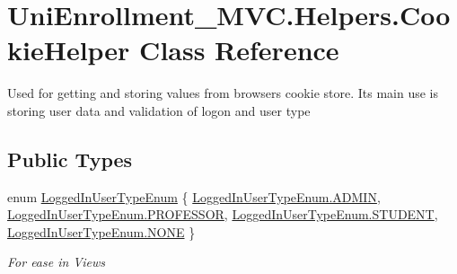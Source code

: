 \hypertarget{class_uni_enrollment___m_v_c_1_1_helpers_1_1_cookie_helper}{}\section{Uni\+Enrollment\+\_\+\+M\+V\+C.\+Helpers.\+Cookie\+Helper Class Reference}
\label{class_uni_enrollment___m_v_c_1_1_helpers_1_1_cookie_helper}


Used for getting and storing values from browser\textquotesingle{}s cookie store. It\textquotesingle{}s main use is storing user data and validation of logon and user type  


\subsection*{Public Types}
\begin{DoxyCompactItemize}
\item 
enum \hyperlink{class_uni_enrollment___m_v_c_1_1_helpers_1_1_cookie_helper_a6ccf3689f1679dfef56e5e7e3a5f17c9}{Logged\+In\+User\+Type\+Enum} \{ \hyperlink{class_uni_enrollment___m_v_c_1_1_helpers_1_1_cookie_helper_a6ccf3689f1679dfef56e5e7e3a5f17c9a73acd9a5972130b75066c82595a1fae3}{Logged\+In\+User\+Type\+Enum.\+A\+D\+M\+IN}, 
\hyperlink{class_uni_enrollment___m_v_c_1_1_helpers_1_1_cookie_helper_a6ccf3689f1679dfef56e5e7e3a5f17c9a172b9057f1e59ddcb93e8522b7968f09}{Logged\+In\+User\+Type\+Enum.\+P\+R\+O\+F\+E\+S\+S\+OR}, 
\hyperlink{class_uni_enrollment___m_v_c_1_1_helpers_1_1_cookie_helper_a6ccf3689f1679dfef56e5e7e3a5f17c9ad0c872afd87e7fbe56a3cdf8f3a0f18c}{Logged\+In\+User\+Type\+Enum.\+S\+T\+U\+D\+E\+NT}, 
\hyperlink{class_uni_enrollment___m_v_c_1_1_helpers_1_1_cookie_helper_a6ccf3689f1679dfef56e5e7e3a5f17c9ab50339a10e1de285ac99d4c3990b8693}{Logged\+In\+User\+Type\+Enum.\+N\+O\+NE}
 \}\begin{DoxyCompactList}\small\item\em For ease in Views \end{DoxyCompactList}
\end{DoxyCompactItemize}
